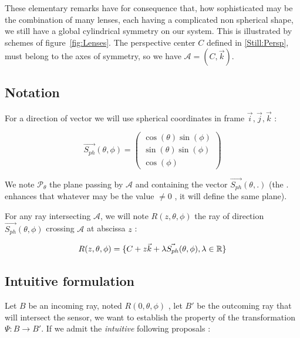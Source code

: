 These elementary remarks have for consequence that, how sophisticated may be the combination
of many lenses, each having a complicated non spherical shape, we still have a global cylindrical
symmetry on our system. This is illustrated by schemes of figure~\ref{fig:Lenses}.
The perspective center $C$ defined in \ref{Still:Persp}, must belong to the axes of symmetry,
so we have $\mathcal{A}=(C,\vec{k})$. 


\subsection{Notation}

For a direction of vector we will use spherical coordinates in frame $\vec{i},\vec{j},\vec{k}$ :

\begin{equation}
	\vec{S_{ph}}(\theta,\phi)   =\begin{pmatrix}  \cos(\theta) \sin(\phi) \\ \sin(\theta) \sin(\phi)  \\ \cos(\phi) \end{pmatrix}
	     \label{PC:Spher:Coord}
\end{equation}

We  note $\mathcal{P}_{\theta}$  the plane passing by $\mathcal{A}$ and containing the vector    $\vec{S_{ph}}(\theta,.)$
(the $.$ enhances that whatever may be the value $\neq 0$ , it will define the same plane).

For any ray intersecting $\mathcal{A}$, we will note $R(z,\theta,\phi)$ the ray of direction $\vec{S_{ph}}(\theta,\phi)$  crossing $\mathcal{A}$
at abscissa $z$  :

\begin{equation}
	R(z,\theta,\phi) = \{C+ z \vec{k} + \lambda \vec{S_{ph}}(\theta,\phi), \lambda \in \mathbb{R}\}
	     \label{PC:RayParam}
\end{equation}



\subsection{Intuitive formulation}

Let $B$ be an incoming ray, noted $ R(0,\theta,\phi)$ , let $B'$ be the outcoming ray  that will intersect the sensor,
we want to establish the property of the transformation  $ \Psi : B \rightarrow B'$.
If we admit the \emph{intuitive} following proposals :


